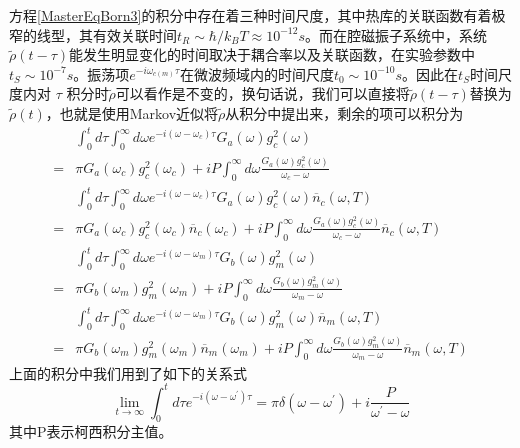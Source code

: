 方程\eqref{MasterEqBorn3}的积分中存在着三种时间尺度，其中热库的关联函数有着极窄的线型\cite{}，其有效关联时间$t_R \sim \hbar/k_B T \approx 10^{-12}s$。而在腔磁振子系统中，系统$\tilde{\rho} (t-\tau)$能发生明显变化的时间取决于耦合率以及关联函数，在实验参数中$t_S \sim 10^{-7}s$。振荡项$e^{-i \omega_{c(m)} \tau}$在微波频域内的时间尺度$t_0 \sim 10^{-10}s$。因此在$t_S$时间尺度内对 $\tau$ 积分时$\tilde{\rho}$可以看作是不变的，换句话说，我们可以直接将$\tilde{\rho} (t-\tau)$替换为$\tilde{\rho} (t)$，也就是使用Markov近似将$\tilde{\rho}$从积分中提出来，剩余的项可以积分为
\begin{equation}
\begin{aligned}
&\int_{0}^{t} d \tau \int_{0}^{\infty} d \omega e^{-i\left(\omega-\omega_{c}\right) \tau} G_a(\omega) g_{c}^{2}(\omega) \\
={}&\pi G_a(\omega_c) g_{c}^{2}(\omega_c)+i P \int_{0}^{\infty} d \omega \frac{G_a(\omega) g_{c}^{2}(\omega)}{\omega_{c}-\omega} \\
&\int_{0}^{t} d \tau \int_{0}^{\infty} d \omega e^{-i\left(\omega-\omega_{c}\right) \tau} G_a(\omega) g_{c}^{2}(\omega) \overline{n}_c(\omega, T) \\
={}&\pi G_a(\omega_c) g_{c}^{2}(\omega_c)\overline{n}_c(\omega_c)+i P \int_{0}^{\infty} d \omega \frac{G_a(\omega) g_{c}^{2}(\omega)}{\omega_{c}-\omega} \overline{n}_c(\omega, T) \\
&\int_{0}^{t} d \tau \int_{0}^{\infty} d \omega e^{-i\left(\omega-\omega_{m}\right) \tau} G_b(\omega) g_{m}^{2}(\omega) \\
={}&\pi G_b(\omega_m) g_{m}^{2}(\omega_m)+i P \int_{0}^{\infty} d \omega \frac{G_b(\omega) g_{m}^{2}(\omega)}{\omega_{m}-\omega} \\
&\int_{0}^{t} d \tau \int_{0}^{\infty} d \omega e^{-i\left(\omega-\omega_{m}\right) \tau} G_b(\omega) g_{m}^{2}(\omega) \overline{n}_m(\omega, T) \\
={}&\pi G_b(\omega_m) g_{m}^{2}(\omega_m)\overline{n}_m(\omega_m)+i P \int_{0}^{\infty} d \omega \frac{G_b(\omega) g_{m}^{2}(\omega)}{\omega_{m}-\omega} \overline{n}_m(\omega, T)
\label{IntergralCorrelations}
\end{aligned}
\end{equation}
上面的积分中我们用到了如下的关系式
\begin{equation}
\lim _{t \rightarrow \infty} \int_{0}^{t} d \tau e^{-i\left(\omega-\omega^{\prime}\right) \tau}=\pi \delta\left(\omega-\omega^{\prime}\right)+i \frac{P}{\omega^{\prime}-\omega}
\end{equation}
其中P表示柯西积分主值。

